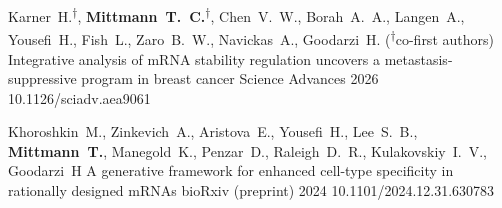 
\sectionList

  \pub
    {Karner~H.\textsuperscript{$\dagger$}, \textbf{Mittmann~T.~C.}\textsuperscript{$\dagger$}, Chen~V.~W., Borah~A.~A., Langen~A., Yousefi~H., Fish~L., Zaro~B.~W., Navickas~A., Goodarzi~H. (\textsuperscript{$\dagger$}co-first authors)}
    {Integrative analysis of mRNA stability regulation uncovers a metastasis-suppressive program in breast cancer}
    {Science Advances}
    {2026}
    {10.1126/sciadv.aea9061}

  \pub
    {Khoroshkin~M., Zinkevich~A., Aristova~E., Yousefi~H., Lee~S.~B., \textbf{Mittmann~T.}, Manegold~K., Penzar~D., Raleigh~D.~R., Kulakovskiy~I.~V., Goodarzi~H}
    {A generative framework for enhanced cell-type specificity in rationally designed mRNAs}
    {bioRxiv (preprint)}
    {2024}
    {10.1101/2024.12.31.630783}

\sectionListEnd
